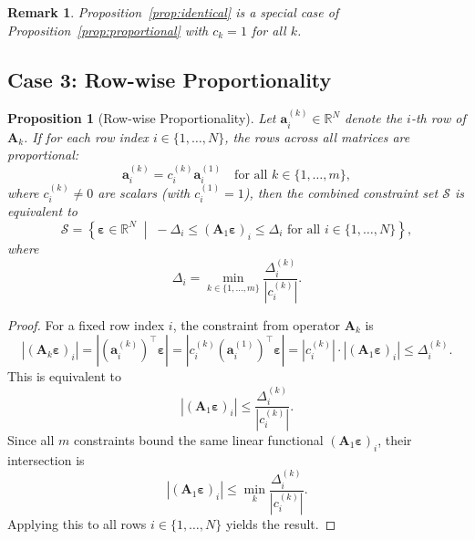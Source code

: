 \documentclass{article}
\newtheorem{proposition}{Proposition}
\newtheorem{remark}{Remark}
\begin{document}
\begin{remark}
Proposition~\ref{prop:identical} is a special case of Proposition~\ref{prop:proportional} with $c_k = 1$ for all $k$.
\end{remark}

\subsection{Case 3: Row-wise Proportionality}

\begin{proposition}[Row-wise Proportionality]
\label{prop:rowwise}
Let $\mathbf{a}_i^{(k)} \in \mathbb{R}^N$ denote the $i$-th row of $\mathbf{A}_k$. If for each row index $i \in \{1, \ldots, N\}$, the rows across all matrices are proportional:
\begin{equation}
    \mathbf{a}_i^{(k)} = c_i^{(k)} \mathbf{a}_i^{(1)} \quad \text{for all } k \in \{1, \ldots, m\},
\end{equation}
where $c_i^{(k)} \neq 0$ are scalars (with $c_i^{(1)} = 1$), then the combined constraint set $\mathcal{S}$ is equivalent to
\begin{equation}
    \mathcal{S} = \left\{ \boldsymbol{\varepsilon} \in \mathbb{R}^N \;\middle|\; -\Delta_i \leq (\mathbf{A}_1 \boldsymbol{\varepsilon})_i \leq \Delta_i \text{ for all } i \in \{1, \ldots, N\} \right\},
\end{equation}
where
\begin{equation}
    \Delta_i = \min_{k \in \{1, \ldots, m\}} \frac{\Delta_i^{(k)}}{|c_i^{(k)}|}.
\end{equation}
\end{proposition}

\begin{proof}
For a fixed row index $i$, the constraint from operator $\mathbf{A}_k$ is
\begin{equation}
    |(\mathbf{A}_k \boldsymbol{\varepsilon})_i| = |(\mathbf{a}_i^{(k)})^\top \boldsymbol{\varepsilon}| = |c_i^{(k)} (\mathbf{a}_i^{(1)})^\top \boldsymbol{\varepsilon}| = |c_i^{(k)}| \cdot |(\mathbf{A}_1 \boldsymbol{\varepsilon})_i| \leq \Delta_i^{(k)}.
\end{equation}
This is equivalent to
\begin{equation}
    |(\mathbf{A}_1 \boldsymbol{\varepsilon})_i| \leq \frac{\Delta_i^{(k)}}{|c_i^{(k)}|}.
\end{equation}
Since all $m$ constraints bound the same linear functional $(\mathbf{A}_1 \boldsymbol{\varepsilon})_i$, their intersection is
\begin{equation}
    |(\mathbf{A}_1 \boldsymbol{\varepsilon})_i| \leq \min_{k} \frac{\Delta_i^{(k)}}{|c_i^{(k)}|}.
\end{equation}
Applying this to all rows $i \in \{1, \ldots, N\}$ yields the result.
\end{proof}
\end{document}
